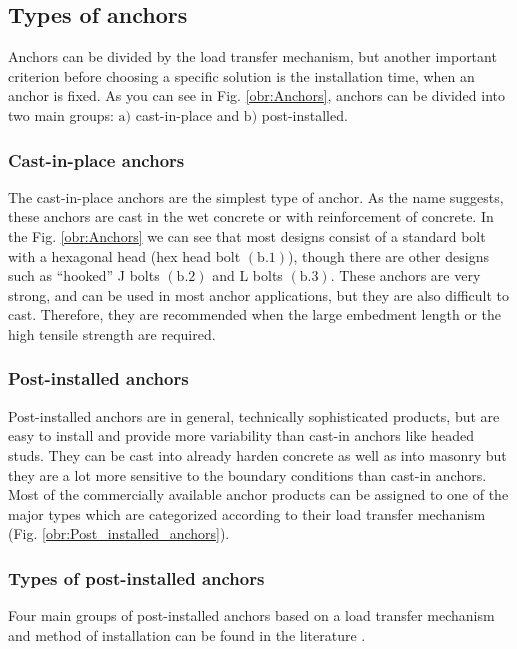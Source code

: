 \newpage
\subsection{Types of anchors}
\indent

Anchors can be divided by the load transfer mechanism, but another important criterion before choosing a specific solution is the installation time, when an anchor is fixed. As you can see in Fig. \ref{obr:Anchors}, anchors can be divided into two main groups: $\mathrm{a)}$ cast-in-place and $\mathrm{b)}$ post-installed. 


\subsubsection{Cast-in-place anchors}
The cast-in-place anchors are the simplest type of anchor. As the name suggests, these anchors are cast in the wet concrete or with reinforcement of concrete. In the Fig. \ref{obr:Anchors} we can see that most designs consist of a standard bolt with a hexagonal head (hex head bolt $\mathrm{(b.1)}$), though there are other designs such as “hooked” J bolts  $\mathrm{(b.2)}$ and L bolts $\mathrm{(b.3)}$. These anchors are very strong, and can be used in most anchor applications, but they are also difficult to cast. Therefore, they are recommended when the large embedment length or the  high tensile strength are required.

\subsubsection{Post-installed anchors}
Post-installed anchors are in general, technically sophisticated products, but are easy to install and provide more variability than cast-in anchors like headed studs. They can be cast into already harden concrete as well as into masonry but they are a lot more sensitive to the boundary conditions than cast-in anchors. Most of the commercially available anchor products can be assigned to one of the major types which are categorized according to their load transfer mechanism (Fig. \ref{obr:Post_installed_anchors}).


\subsubsection{Types of post-installed anchors}
Four main groups of post-installed anchors based on a load transfer mechanism and method of installation can be found in the literature \cite{hilti_anchors}.
 
